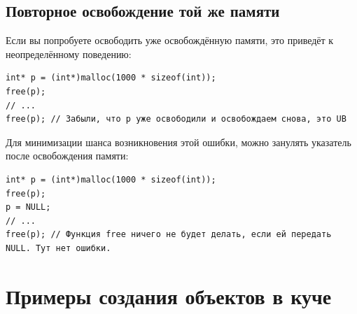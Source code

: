 \documentclass[10pt]{article}
\begin{document}
\subsection*{Повторное освобождение той же памяти}
Если вы попробуете освободить уже освобождённую памяти, это приведёт к неопределённому поведению:
\begin{lstlisting}
int* p = (int*)malloc(1000 * sizeof(int));
free(p);
// ...
free(p); // Забыли, что p уже освободили и освобождаем снова, это UB
\end{lstlisting}
Для минимизации шанса возникновения этой ошибки, можно занулять указатель после освобождения памяти:
\begin{lstlisting}
int* p = (int*)malloc(1000 * sizeof(int));
free(p);
p = NULL;
// ...
free(p); // Функция free ничего не будет делать, если ей передать NULL. Тут нет ошибки.
\end{lstlisting}


\section*{Примеры создания объектов в куче}
\end{document}

